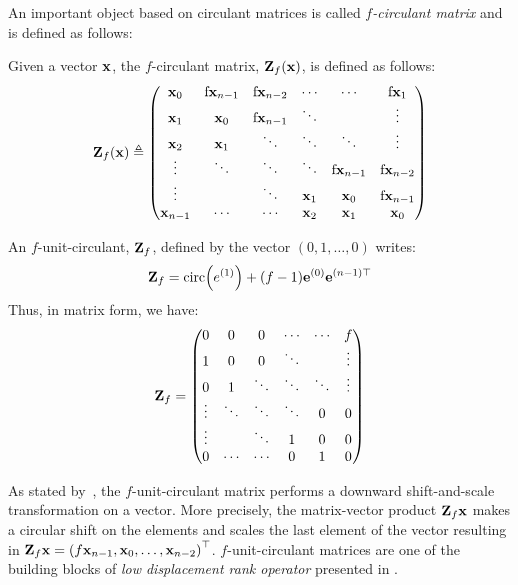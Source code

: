 An important object based on circulant matrices is called \emph{$f$-circulant matrix} and is defined as follows:
\begin{definition} \label{definition:ch2-f_circulant_matrix}
  Given a vector $\mathbf{x}$, the $f$-circulant matrix, $\mathbf{Z}_f(\mathbf{x})$, is defined as follows:
  \begin{equation}
    \Zmat_f(\xvec) \triangleq
    \leftmatrix
      \xvec_0 & $f$ \xvec_{n-1} & $f$ \xvec_{n-2} & \cdots & \cdots & $f$ \xvec_{1} \\
      \xvec_{1} & \xvec_0 & $f$ \xvec_{n-1} & \ddots & & \vdots \\
      \xvec_{2} & \xvec_{1} & \ddots & \ddots & \ddots & \vdots \\ 
      \vdots & \ddots & \ddots & \ddots & $f$ \xvec_{n-1} & $f$ \xvec_{n-2} \\
      \vdots & & \ddots & \xvec_{1} & \xvec_{0} & $f$ \xvec_{n-1} \\
      \xvec_{n-1} & \cdots & \cdots & \xvec_{2} & \xvec_{1} & \xvec_0
    \rightmatrix
  \end{equation}
  \removespace
\end{definition}
\noindent
An $f$-unit-circulant, $\mathbf{Z}_f$, defined by the vector $\left(0, 1, \dots, 0 \right)$ writes:
\begin{equation}
  \Zmat_f = \circulant \left(e^{(1)} \right) + (f - 1) \evec^{(0)} \evec^{(n-1)\top}
\end{equation}
\noindent
Thus, in matrix form, we have:
\begin{equation}
  \mathbf{Z}_f = 
    \begin{pmatrix}
      0      & 0      & 0      & \cdots & \cdots & f      \\
      1      & 0      & 0      & \ddots &        & \vdots \\
      0      & 1      & \ddots & \ddots & \ddots & \vdots \\ 
      \vdots & \ddots & \ddots & \ddots & 0      & 0      \\
      \vdots &        & \ddots & 1      & 0      & 0      \\
      0      & \cdots & \cdots & 0      & 1      & 0
    \end{pmatrix}
\end{equation}

\noindent
As stated by~\citet{sindhwani2015structured}, the $f$-unit-circulant matrix performs a downward shift-and-scale transformation on a vector.
More precisely, the matrix-vector product $\mathbf{Z}_f \mathbf{x}$ makes a circular shift on the elements and scales the last element of the vector resulting in $\Zmat_f \xvec = \leftmat f \xvec_{n-1}, \xvec_0, \dots, \xvec_{n-2} \rightmat^\top$. 
$f$-unit-circulant matrices are one of the building blocks of \emph{low displacement rank operator} presented in .


